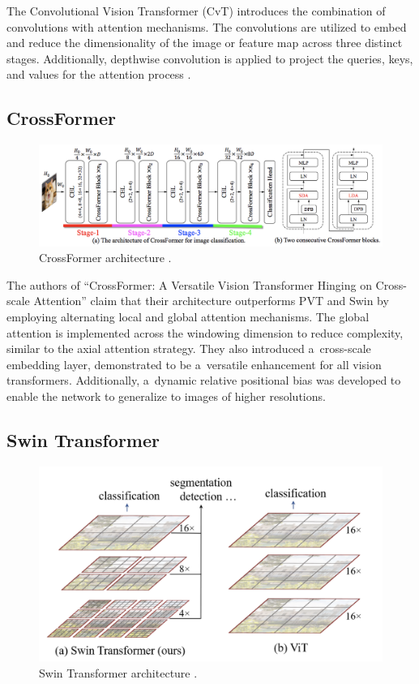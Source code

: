 The Convolutional Vision Transformer (CvT) introduces the combination of convolutions with attention mechanisms. The convolutions are utilized to embed and reduce the dimensionality of the image or feature map across three distinct stages. Additionally, depthwise convolution is applied to project the queries, keys, and values for the attention process \cite{wu2021cvtintroducingconvolutionsvision}.

\subsection*{CrossFormer}

\begin{figure}[htbp]
    \centering
    \includegraphics[width=\linewidth]{obrazky-figures/02-theoretical-basis/crossformer.png}
    \caption{CrossFormer architecture \cite{wang2021crossformerversatilevisiontransformer}.}
    \label{fig:crossformer}
\end{figure}

The authors of \enquote{CrossFormer: A Versatile Vision Transformer Hinging on Cross-scale Attention} \cite{wang2021crossformerversatilevisiontransformer} claim that their architecture outperforms PVT and Swin by employing alternating local and global attention mechanisms. The global attention is implemented across the windowing dimension to reduce complexity, similar to the axial attention strategy. They also introduced a~cross-scale embedding layer, demonstrated to be a~versatile enhancement for all vision transformers. Additionally, a~dynamic relative positional bias was developed to enable the network to generalize to images of higher resolutions.

\subsection*{Swin Transformer}

\begin{figure}[htbp]
    \centering
    \includegraphics[width=0.8\linewidth]{obrazky-figures/02-theoretical-basis/swin.png}
    \caption{Swin Transformer architecture \cite{liu2021swintransformerhierarchicalvision}.}
    \label{fig:swin}
\end{figure}

